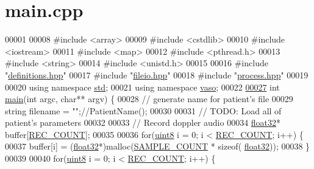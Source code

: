 \hypertarget{main_8cpp_source}{\section{main.\+cpp}
\label{main_8cpp_source}
}

\begin{DoxyCode}
00001 
00008 \textcolor{preprocessor}{#include <array>}
00009 \textcolor{preprocessor}{#include <cstdlib>}
00010 \textcolor{preprocessor}{#include <iostream>}
00011 \textcolor{preprocessor}{#include <map>}
00012 \textcolor{preprocessor}{#include <pthread.h>}
00013 \textcolor{preprocessor}{#include <string>}
00014 \textcolor{preprocessor}{#include <unistd.h>}
00015 
00016 \textcolor{preprocessor}{#include "\hyperlink{definitions_8hpp}{definitions.hpp}"}
00017 \textcolor{preprocessor}{#include "\hyperlink{fileio_8hpp}{fileio.hpp}"}
00018 \textcolor{preprocessor}{#include "\hyperlink{process_8hpp}{process.hpp}"}
00019 
00020 \textcolor{keyword}{using namespace }\hyperlink{namespacestd}{std};
00021 \textcolor{keyword}{using namespace }\hyperlink{namespacevaso}{vaso};
00022 
\hypertarget{main_8cpp_source_l00027}{}\hyperlink{main_8cpp_a3c04138a5bfe5d72780bb7e82a18e627}{00027} \textcolor{keywordtype}{int} \hyperlink{main_8cpp_a3c04138a5bfe5d72780bb7e82a18e627}{main}(\textcolor{keywordtype}{int} argc, \textcolor{keywordtype}{char}** argv) \{
00028     \textcolor{comment}{// generate name for patient's file}
00029     \textcolor{keywordtype}{string} filename = \textcolor{stringliteral}{""};\textcolor{comment}{//PatientName();}
00030 
00031     \textcolor{comment}{// TODO: Load all of patient's parameters}
00032 
00033     \textcolor{comment}{// Record doppler audio}
00034     \hyperlink{definitions_8hpp_aacdc525d6f7bddb3ae95d5c311bd06a1}{float32}* buffer[\hyperlink{definitions_8hpp_aa44e6143be9e89f19be973956c22e134}{REC\_COUNT}];
00035 
00036     \textcolor{keywordflow}{for}(\hyperlink{definitions_8hpp_adde6aaee8457bee49c2a92621fe22b79}{uint8} i = 0; i < \hyperlink{definitions_8hpp_aa44e6143be9e89f19be973956c22e134}{REC\_COUNT}; i++) \{
00037         buffer[i] = (\hyperlink{definitions_8hpp_aacdc525d6f7bddb3ae95d5c311bd06a1}{float32}*)malloc(\hyperlink{definitions_8hpp_a1682c770d91c5d167b621a782be940d4}{SAMPLE\_COUNT} * \textcolor{keyword}{sizeof}(
      \hyperlink{definitions_8hpp_aacdc525d6f7bddb3ae95d5c311bd06a1}{float32}));
00038     \}
00039     
00040     \textcolor{keywordflow}{for}(\hyperlink{definitions_8hpp_adde6aaee8457bee49c2a92621fe22b79}{uint8} i = 0; i < \hyperlink{definitions_8hpp_aa44e6143be9e89f19be973956c22e134}{REC\_COUNT}; i++) \{

\end{DoxyCode}
